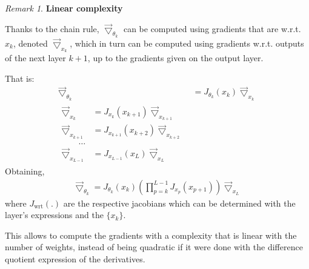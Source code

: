 \documentclass{article}
\theoremstyle{definition}
\theoremstyle{remark}
\newtheorem{remark}{Remark}
\theoremstyle{plain}
\newcommand{\ovec}{}
\begin{document}
\begin{remark}\textbf{Linear complexity}\\
{Thanks to the chain rule, $\vec{\bigtriangledown}_{\theta_k}$ can be computed using gradients that are w.r.t. $\ovec{x_k}$, denoted $\vec{\bigtriangledown}_{x_k}$, which in turn can be computed using gradients w.r.t. outputs of the next layer $k+1$, up to the gradients given on the output layer.

That is:
\begin{align}
  \vec{\bigtriangledown}_{\theta_k} & = J_{\theta_k}(\ovec{x_k}) \vec{\bigtriangledown}_{x_k} \\
  \begin{split}
  \vec{\bigtriangledown}_{x_k} & = J_{x_k}(\ovec{x_{k+1}}) \vec{\bigtriangledown}_{x_{k+1}} \\
  \vec{\bigtriangledown}_{x_{k+1}} & = J_{x_{k+1}}(\ovec{x_{k+2}}) \vec{\bigtriangledown}_{x_{k+2}} \\
  \quad \quad \ldots\\
  \vec{\bigtriangledown}_{x_{L-1}} & = J_{x_{L-1}}(\ovec{x_{L}}) \vec{\bigtriangledown}_{x_{L}}
  \label{eq:bp}
  \end{split}
\end{align}
Obtaining,
\begin{align}
  \vec{\bigtriangledown}_{\theta_k} = J_{\theta_k}(\ovec{x_k}) (\prod_{p=k}^{L-1} J_{x_p}(\ovec{x_{p+1}})) \vec{\bigtriangledown}_{x_L}
\end{align}
where $J_{\text{wrt}}(.)$ are the respective jacobians which can be determined with the layer's expressions and the $\{x_k\}$.

This allows to compute the gradients with a complexity that is linear with the number of weights, instead of being quadratic if it were done with the difference quotient expression of the derivatives.}
\end{remark}
\end{document}
